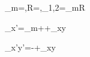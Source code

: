 \sigma_m=,\quad R=,\quad\sigma_{1,2}=\sigma_m\pm R

\sigma_{x'}=\sigma_m+\theta+\tau_{xy}\theta

\tau_{x'y'}=-\theta+\tau_{xy}\theta
